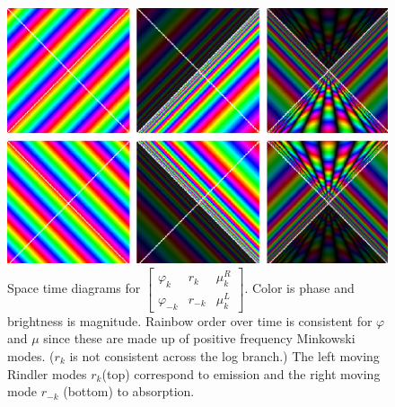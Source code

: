 \documentclass[12pt,a4paper]{article}
\begin{document}
\begin{figure}[h]
\centering
\includegraphics[scale=0.5]{unruh_mode_rainbow.png}
\caption{Space time diagrams for $\left[\begin{array}{ccc} \varphi_k & r_k & \mu^R_k \\ \varphi_{-k} & r_{-k} & \mu^L_k \end{array} \right]$.  Color is phase and brightness is magnitude. Rainbow order over time is consistent for $\varphi$ and $\mu$ since these are made up of positive frequency Minkowski modes. ($r_k$ is not consistent across the log branch.) The left moving Rindler modes $r_k$(top) correspond to emission and the right moving mode $r_{-k}$ (bottom) to absorption.}
\label{unruh_rainbow}
\end{figure}
\end{document}
